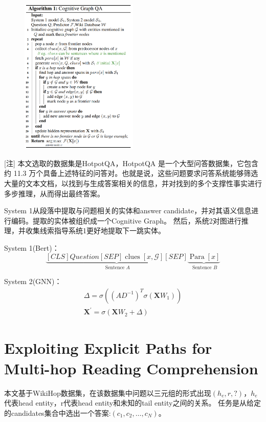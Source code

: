 \documentclass[a4paper,UTF8]{article}
\numberwithin{equation}{section}
\begin{document}
\begin{figure}[H]
	\centering
	\includegraphics[width=0.5\textwidth]{1-2.png}
\end{figure}
[注] 本文选取的数据集是HotpotQA，HotpotQA 是一个大型问答数据集，它包含约 11.3 万个具备上述特征的问答对。也就是说，这些问题要求问答系统能够筛选大量的文本文档，以找到与生成答案相关的信息，并对找到的多个支撑性事实进行多步推理，从而得出最终答案。

System 1从段落中提取与问题相关的实体和answer candidate，并对其语义信息进行编码。提取的实体被组织成一个Cognitive Graph。
然后，系统2对图进行推理，并收集线索指导系统1更好地提取下一跳实体。

System 1(Bert)：\\
\begin{equation}
	\underbrace{[C L S] Q u e s t i o n[S E P] \operatorname{clues}[x, \mathcal{G}][S E P]}_{\text { Sentence } A} \underbrace{\operatorname{Para}[x]}_{\text { Sentence } B}
	\end{equation}

System 2(GNN)： \\
\begin{equation}
\begin{array}{l}{\Delta=\sigma\left(\left(A D^{-1}\right)^{T} \sigma\left(\mathbf{X} W_{1}\right)\right)} \\ {\mathbf{X}^{\prime}=\sigma\left(\mathbf{X} W_{2}+\Delta\right)}\end{array}
\end{equation}
\newpage
\section{Exploiting Explicit Paths for Multi-hop Reading Comprehension}
本文基于WikiHop数据集，在该数据集中问题以三元组的形式出现$\left(h_{e}, r, ?\right)$，$h_e$代表head entity，r代表head entity和未知的tail entity之间的关系。
任务是从给定的candidates集合中选出一个答案:$\left(c_{1}, c_{2}, \dots, c_{N}\right)$。
\end{document}
